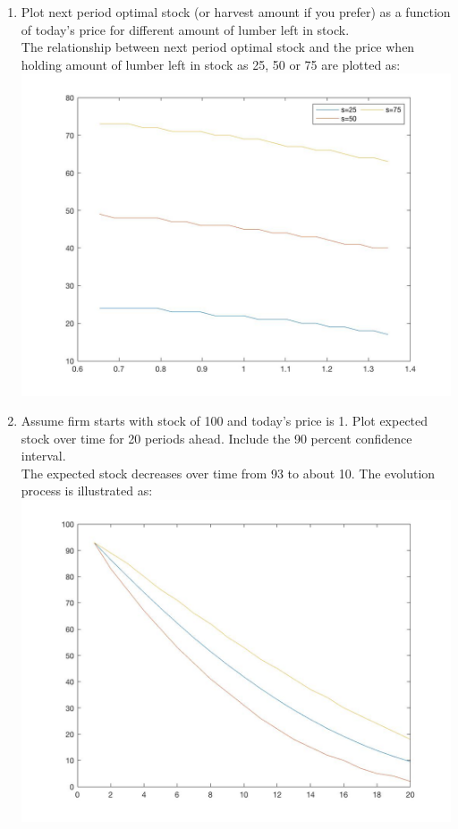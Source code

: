 \documentclass[11pt]{article}
\begin{document}
\begin{enumerate}
\item Plot next period optimal stock (or harvest amount if you prefer) as a function of today's price for different amount of lumber left in stock.\\[1em]

The relationship between next period optimal stock and the price when holding amount of lumber left in stock as 25, 50 or 75 are plotted as:\\
    \includegraphics[scale=0.2]{spolp.jpg}


\item Assume firm starts with stock of 100 and today's price is 1. Plot expected stock over time for 20 periods ahead. Include the 90 percent confidence interval. \\[1em]

The expected stock decreases over time from 93 to about 10. The evolution process is illustrated as: \\
 \includegraphics[scale=0.2]{spath.jpg}


\end{enumerate}
\end{document}
